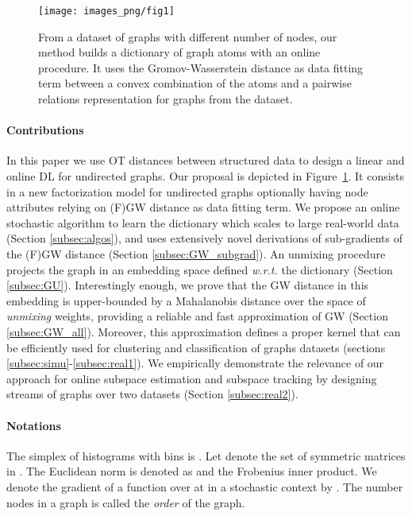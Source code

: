 \documentclass{article}
\begin{document}
	\begin{figure}[!t]
		\texttt{[image: images\_png/fig1]}\vspace{-8mm}
		\caption{ From a dataset of graphs with different number of nodes, our method builds
			a dictionary of graph atoms with an online procedure. It uses the
			Gromov-Wasserstein distance as data fitting term between a  convex
			combination of the atoms and a pairwise relations representation for graphs
			from the dataset.}
		\label{fig:f1}
		\vspace{-5mm}
	\end{figure}
	
	\paragraph{Contributions}
	In this paper we use OT distances between structured data to design a linear and online DL for undirected graphs. Our proposal is depicted in Figure~\ref{fig:f1}. It
	consists in a new factorization model for undirected graphs optionally having node attributes relying on (F)GW distance as data fitting term. We propose an online 
	stochastic algorithm to learn the dictionary which scales to large real-world
	data (Section \ref{subsec:algos}), and uses extensively novel derivations of
	sub-gradients of the (F)GW distance (Section \ref{subsec:GW_subgrad}).  An
	unmixing procedure projects the graph in an embedding space defined {\em w.r.t.}
	the dictionary (Section \ref{subsec:GU}). Interestingly enough, we prove that
	the GW distance in this embedding is upper-bounded by a Mahalanobis distance
	over the space of \emph{unmixing} weights, providing a reliable and fast
	approximation of GW (Section \ref{subsec:GW_all}). Moreover, this approximation
	defines a proper kernel that can be efficiently used for clustering and
	classification of graphs datasets (sections
	\ref{subsec:simu}-\ref{subsec:real1}). We empirically demonstrate the relevance
	of our approach for online subspace estimation and subspace tracking by
	designing streams of graphs over two datasets (Section \ref{subsec:real2}).
	
	\paragraph{Notations}
	The simplex of histograms with  bins is . Let
	denote   the set of symmetric matrices in . The Euclidean norm is denoted as  and  the Frobenius inner product. We denote the gradient of a function  over  at  in a stochastic context by . The number nodes in a graph is called  the \emph{order} of the graph.
	
\end{document}
